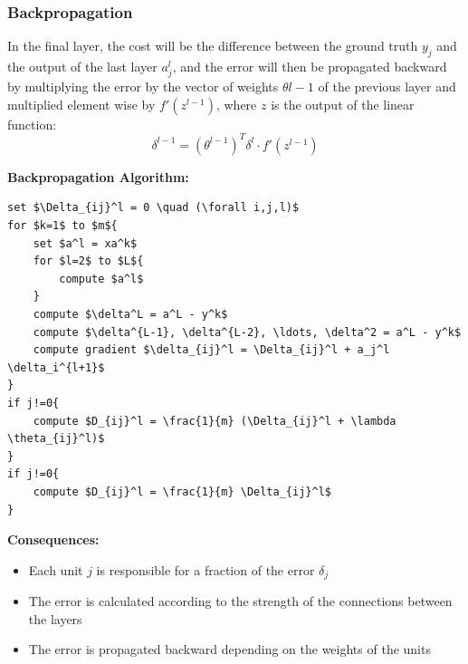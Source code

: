 \subsubsection{Backpropagation}
In the final layer, the cost will be the difference between the ground truth $y_j$ and the output of the last layer $a_j^l$, and the error will then be propagated backward by multiplying the error by the vector of weights $\theta{l-1}$ of the previous layer and multiplied element wise by $f'(z^{l-1})$, where $z$ is the output of the linear function:
\begin{equation} \tag*{}
    \delta^{l-1} = (\theta^{l-1})^T \delta^{l} \cdot f'(z^{l-1})
\end{equation}

\raggedright
\textbf{Backpropagation Algorithm:}
\begin{lstlisting}[mathescape=true]
set $\Delta_{ij}^l = 0 \quad (\forall i,j,l)$
for $k=1$ to $m${
    set $a^l = xa^k$
    for $l=2$ to $L${
        compute $a^l$
    }
    compute $\delta^L = a^L - y^k$
    compute $\delta^{L-1}, \delta^{L-2}, \ldots, \delta^2 = a^L - y^k$
    compute gradient $\delta_{ij}^l = \Delta_{ij}^l + a_j^l \delta_i^{l+1}$
}
if j!=0{
    compute $D_{ij}^l = \frac{1}{m} (\Delta_{ij}^l + \lambda \theta_{ij}^l)$
}
if j!=0{
    compute $D_{ij}^l = \frac{1}{m} \Delta_{ij}^l$
}
\end{lstlisting}
\textbf{Consequences:}
\begin{itemize}
    \item Each unit $j$ is responsible for a fraction of the error $\delta_j$
    \item The error is calculated according to the strength of the connections between the layers
    \item The error is propagated backward depending on the weights of the units
\end{itemize}

\newpage